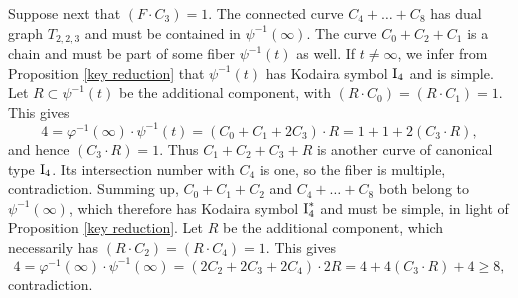 \documentclass[oneside, 12pt]{amsart}
\theoremstyle{definition}
\theoremstyle{remark}
\newcommand{\I}{\text{\rm I}}
\begin{document}
Suppose next that $(F\cdot C_3)=1$.  
The connected curve $C_4+\ldots+C_8$ has dual graph $T_{2,2,3}$ and must be contained in   $\psi^{-1}(\infty)$.
The curve $C_0+C_2+C_1$ is a chain and must be part of some fiber $\psi^{-1}(t)$ as well.
If $t\neq\infty$, 
we infer from Proposition \ref{key reduction} that $\psi^{-1}(t)$ has Kodaira symbol $\I_4$ 
and is simple.  Let $R\subset \psi^{-1}(t)$ be the additional component, with $(R\cdot C_0)=(R\cdot C_1)=1$.
This gives 
$$
4=\varphi^{-1}(\infty)\cdot \psi^{-1}(t) = (C_0+C_1+2C_3) \cdot R = 1+1+ 2(C_3\cdot R),
$$
and hence  $(C_3\cdot R)=1$. Thus $C_1+C_2+C_3+R$ is another curve of canonical type $\I_4$. Its intersection number with $C_4$ is one,
so the fiber is multiple, contradiction.
Summing up,  $C_0+C_1+C_2$ and $C_4+\ldots+C_8$ both belong to   $\psi^{-1}(\infty)$, which therefore
has Kodaira symbol $\I_4^*$ and must be simple, in light of Proposition \ref{key reduction}. Let $R$ be the additional component, which necessarily has
$(R\cdot C_2)=(R\cdot C_4)=1$. This gives 
$$
4=\varphi^{-1}(\infty)\cdot \psi^{-1}(\infty) = (2C_2+2C_3+2C_4)\cdot 2R = 4+4(C_3\cdot R) + 4\geq 8,
$$
contradiction.
\end{document}
